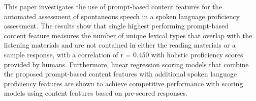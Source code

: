 This paper investigates the use of prompt-based content features for the automated assessment of spontaneous speech in a spoken language proficiency
 assessment. The results show that single highest performing prompt-based
 content feature measures the number of unique lexical types that overlap with
 the listening materials and are not contained in either the reading materials
 or a sample response, with a correlation of r = 0.450 with holistic proficiency
 scores provided by humans. Furthermore, linear regression scoring models that
 combine the proposed prompt-based content features with additional spoken
 language proficiency features are shown to achieve competitive performance with
 scoring models using content features based on pre-scored responses.

